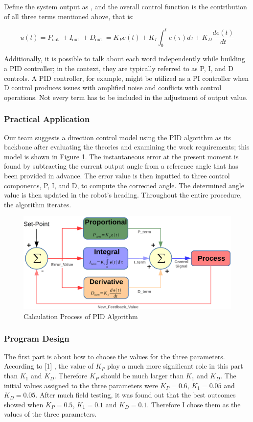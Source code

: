 \documentclass[12pt, a4paper, oneside]{report}
\begin{document}
Define the system output as , and the overall control function is the contribution of all three 
terms mentioned above, that is:
\begin{tcolorbox}
$$u(t)=P_{\text {out }}+I_{\text {out }}+D_{\text {out }}=K_P e(t)+K_I \int_0^t e(\tau) d \tau+K_D \frac{d e(t)}{d t}$$
\end{tcolorbox}
Additionally, it is possible to talk about each word independently while building a PID controller; in the context, they are typically referred to as P, I, and D controls. A PID controller, for example, might be utilized as a PI controller when D control produces issues with amplified noise and conflicts with control operations. Not every term has to be included in the adjustment of output value.
\subsubsection{Practical Application}
Our team suggests a direction control model using the PID algorithm as its backbone after evaluating the theories and examining the work requirements; this model is shown in Figure \ref{fig:PID}. The instantaneous error at the present moment is found by subtracting the current output angle from a reference angle that has been provided in advance. The error value is then inputted to three control components, P, I, and D, to compute the corrected angle. The determined angle value is then updated in the robot's heading. Throughout the entire procedure, the algorithm iterates. 

\begin{figure}[H]
  \centering
  \includegraphics[width=1\textwidth]{pic/Navigation/PID-1.png}
  \caption{Calculation Process of PID Algorithm \cite{9314541}}
  \label{fig:PID}
\end{figure}

\subsubsection{Program Design}
The first part is about how to choose the values for the three parameters. According to [1] , the value of $K_P$ play a much more significant role in this part than $K_1$ and $K_D$. Therefore $K_P$ should be much larger than $K_1$ and $K_D$. The initial values assigned to the three parameters were $K_P=0.6$, $K_1=0.05$ and $K_D=0.05$. After much field testing, it was found out that the best outcomes showed when $K_P=0.5$, $K_1=0.1$ and $K_D=0.1$. Therefore I chose them as the values of the three parameters.
\end{document}
